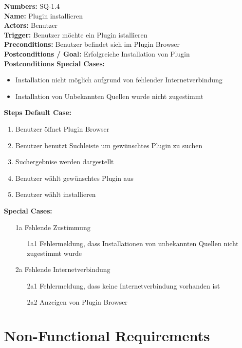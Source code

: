 \documentclass{article}
\begin{document}
\textbf{Numbers:} SQ-1.4\\
    \textbf{Name:} Plugin installieren\\
    \textbf{Actors:} Benutzer\\
    \textbf{Trigger:} Benutzer möchte ein Plugin istallieren\\
    \textbf{Preconditions:}  Benutzer befindet sich im Plugin Browser\\
    \textbf{Postconditions / Goal:} Erfolgreiche Installation von Plugin\\
    \textbf{Postconditions Special Cases:}
    \begin{itemize}
        \item Installation nicht möglich aufgrund von fehlender Internetverbindung
        \item Installation von Unbekannten Quellen wurde nicht zugestimmt
    \end{itemize}
    \textbf{Steps Default Case:} 
    \begin{enumerate}
        \item Benutzer öffnet Plugin Browser
        \item Benutzer benutzt Suchleiste um gewünschtes Plugin zu suchen
        \item Suchergebnise werden dargestellt 
        \item Benutzer wählt gewünschtes Plugin aus
        \item Benutzer wählt installieren
    \end{enumerate}
\textbf{Special Cases:}
\begin{itemize}
    \item [1a] Fehlende Zustimmung
    \begin{itemize}
        \item [1a1] Fehlermeldung, dass Installationen von unbekannten Quellen nicht zugestimmt wurde
    \end{itemize}
    \end{itemize}
        
\begin{itemize}
    \item [2a] Fehlende Internetverbindung  
    \begin{itemize}
        \item [2a1] Fehlermeldung, dass keine Internetverbindung vorhanden ist 
        \item [2a2] Anzeigen von Plugin Browser
    \end{itemize}
\end{itemize}
\section{Non-Functional Requirements}
\end{document}
